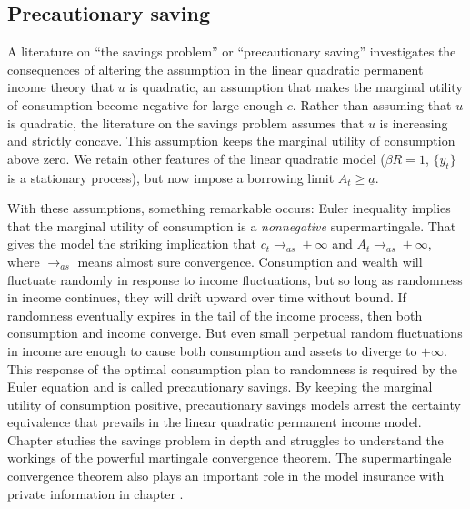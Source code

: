 \subsection{Precautionary saving}\label{sec:intro_precautionary}%
A literature on ``the  savings problem'' or ``precautionary saving''
investigates the consequences of altering the assumption in the
linear quadratic permanent income theory that $u$
is quadratic, an assumption that makes   the marginal utility of consumption
become  negative for large enough $c$. Rather than assuming that
$u$ is quadratic, the literature on the savings problem
assumes that $u$ is increasing and strictly
concave.  This assumption keeps the marginal utility of
consumption above zero.   We retain other features of the
linear quadratic model ($\beta R=1$, $\{y_t\}$ is a stationary
process), but now impose a borrowing limit $A_t \geq \underline
a$.

With these assumptions, something remarkable occurs:   Euler
inequality  implies that the marginal  utility of
consumption is a {\it nonnegative\/}
supermartingale. That gives the
model the striking implication that $c_t \rightarrow_{as} +\infty$
and $A_t \rightarrow_{as} +\infty$, where $\rightarrow_{as}$ means
almost sure convergence. Consumption and wealth will fluctuate
randomly in response to income fluctuations, but so long as
randomness in income continues,
 they will drift upward over time without bound.
  If
randomness eventually expires in the tail of the income
 process, then both consumption
and income  converge.  But even
small perpetual random fluctuations
in income are enough to cause both consumption and assets to diverge
to $+\infty$.   This  response
of the optimal consumption
plan to randomness is required by the Euler equation  and
is called precautionary savings.
By keeping the marginal utility of consumption positive,
precautionary savings models arrest the  certainty equivalence  that prevails
in the linear quadratic permanent income model.
Chapter  studies the savings problem in depth and struggles
to understand the workings of the powerful martingale convergence theorem.
The supermartingale convergence theorem also plays an important role in the model
insurance with private information in chapter .

